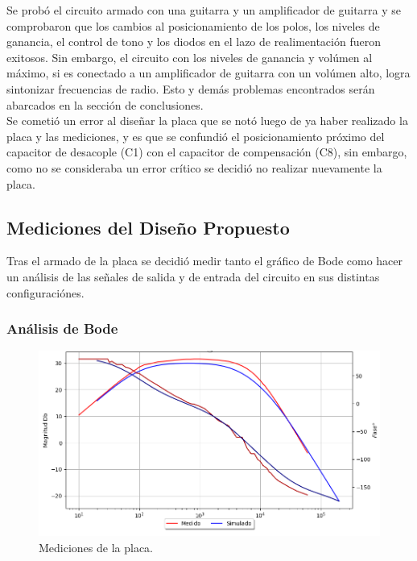 Se probó el circuito armado con una guitarra y un amplificador de guitarra y se comprobaron que los cambios al posicionamiento de los polos, los niveles de ganancia, el control de tono y los diodos en el lazo de realimentación fueron exitosos. Sin embargo, el circuito con los niveles de ganancia y volúmen al máximo, si es conectado a un amplificador de guitarra con un volúmen alto, logra sintonizar frecuencias de radio. Esto y demás problemas encontrados serán abarcados en la sección de conclusiones. \\

Se cometió un error al diseñar la placa que se notó luego de ya haber realizado la placa y las mediciones, y es que se confundió el posicionamiento próximo del capacitor de desacople (C1) con el capacitor de compensación (C8), sin embargo, como no se consideraba un error crítico se decidió no realizar nuevamente la placa.

\subsection{Mediciones del Diseño Propuesto}

Tras el armado de la placa se decidió medir tanto el gráfico de Bode como hacer un análisis de las señales de salida y de entrada del circuito en sus distintas configuraciónes.

\subsubsection{Análisis de Bode}

\begin{figure}[H]
	\centering
	\includegraphics[width=1\textwidth, trim={0 0 0 0}, clip]{Ejercicio5/Imagenes/Propuesto/Mediciones/bode_comp.png}
	\caption{Mediciones de la placa.}
	\label{fig:prop_bode}
\end{figure}

